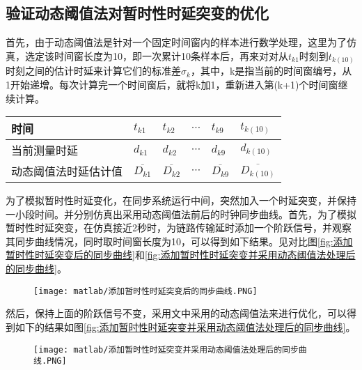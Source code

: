 \subsection{验证动态阈值法对暂时性时延突变的优化}
首先，由于动态阈值法是针对一个固定时间窗内的样本进行数学处理，这里为了仿真，选定该时间窗长度为10，即一次累计10条样本后，再来对对从$t_{k1}$时刻到$t_{k(10)}$时刻之间的估计时延来计算它们的标准差$\sigma_{k}$，其中，k是指当前的时间窗编号，从1开始递增。每次计算完一个时间窗后，就将k加1，重新进入第(k+1)个时间窗继续计算。
\begin{table}[!hpb]
  \centering
  \begin{tabular}{llllll} \toprule
    时间 & $t_{k1}$ & $t_{k2}$ & $\cdots$ & $t_{k9}$ & $t_{k(10)}$ \\ \midrule
    当前测量时延 & $d_{k1}$ & $d_{k2}$ & $\cdots$ & $d_{k9}$ & $d_{k(10)}$ \\ \midrule
    动态阈值法时延估计值 & $\overline{D_{k1}}$ & $\overline{D_{k2}}$ & $\cdots$ & $\overline{D_{k9}}$ & $\overline{D_{k(10)}}$  \\ \bottomrule
  \end{tabular}
\end{table}

为了模拟暂时性时延变化，在同步系统运行中间，突然加入一个时延突变，并保持一小段时间。并分别仿真出采用动态阈值法前后的时钟同步曲线。首先，为了模拟暂时性时延突变，在仿真接近2秒时，为链路传输延时添加一个阶跃信号，并观察其同步曲线情况，同时取时间窗长度为10，可以得到如下结果。见对比图\ref{fig:添加暂时性时延突变后的同步曲线}和\ref{fig:添加暂时性时延突变并采用动态阈值法处理后的同步曲线}。
\begin{figure}[htbp]
  \centering
  \begin{minipage}[b]{1\textwidth}
    \captionstyle{\centering}
    \centering
    \texttt{[image: matlab/添加暂时性时延突变后的同步曲线.PNG]}
  \end{minipage}     
\end{figure}

然后，保持上面的阶跃信号不变，采用文中采用的动态阈值法来进行优化，可以得到如下的结果如图\ref{fig:添加暂时性时延突变并采用动态阈值法处理后的同步曲线}。
\begin{figure}[!hbp]
  \centering
  \begin{minipage}[b]{1\textwidth}
    \captionstyle{\centering}
    \centering
    \texttt{[image: matlab/添加暂时性时延突变并采用动态阈值法处理后的同步曲线.PNG]}
  \end{minipage}     
\end{figure}

